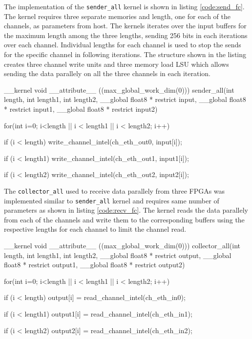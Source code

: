 The implementation of the \texttt{sender\_all} kernel is shown in listing \ref{code:send_fc}.
The kernel requires three separate memories and length, one for each of the channels, as
parameters from host. The kernels iterates over the input buffers for the maximum length
among the three lengths, sending 256 bits in each iterations over each channel. Individual
lengths for each channel is used to stop the sends for the specific channel in following
iterations. The structure shown in the listing creates three channel write units and three
memory load \ac{LSU} which allows sending the data parallely on all the three channels
in each iteration.

\begin{CppCode} [caption=Sender Kernel for fully connected, frame=tlrb, label=code:send_fc]
__kernel void __attribute__ ((max_global_work_dim(0)))
sender_all(int length, int length1, int length2,
            __global float8 * restrict input,
            __global float8 * restrict input1,
            __global float8 * restrict input2)
{
    for(int i=0; i<length || i < length1 || i < length2; i++)
    {
        if (i < length)
            write_channel_intel(ch_eth_out0, input[i]);

        if (i < length1)
            write_channel_intel(ch_eth_out1, input1[i]);

        if (i < length2)
            write_channel_intel(ch_eth_out2, input2[i]);
    }
}
\end{CppCode}

The \texttt{collector\_all} used to receive data parallely from three FPGAs
was implemented similar to \texttt{sender\_all} kernel and requires same
number of parameters as shown in listing \ref{code:recv_fc}. The kernel
reads the data parallely from each of the channels and write them to the
corresponding buffers using the respective lengths for each channel
to limit the channel read.

\begin{CppCode} [caption=Collector Kernel for fully connected, frame=tlrb, label=code:recv_fc]
__kernel void __attribute__ ((max_global_work_dim(0)))
collector_all(int length, int length1, int length2,
            __global float8 * restrict output,
            __global float8 * restrict output1,
            __global float8 * restrict output2)
{
    for(int i=0; i<length || i < length1 || i < length2; i++)
    {
        if (i < length)
            output[i] = read_channel_intel(ch_eth_in0);

        if (i < length1)
            output1[i] = read_channel_intel(ch_eth_in1);

        if (i < length2)
            output2[i] = read_channel_intel(ch_eth_in2);
    }
}
\end{CppCode}

